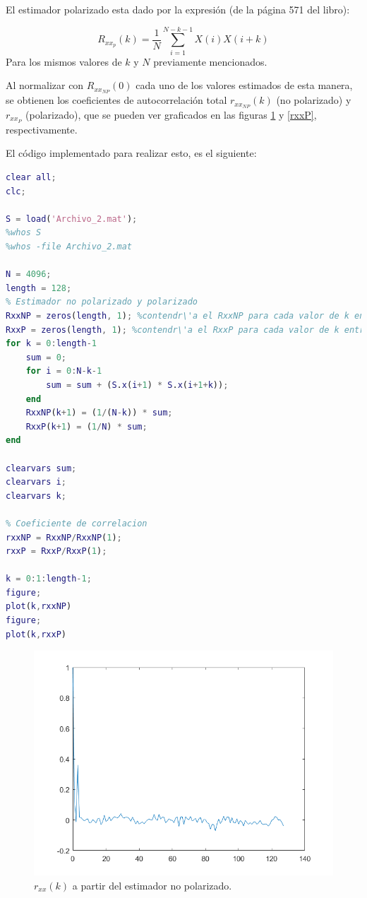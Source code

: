 El estimador polarizado esta dado por la expresión (de la página 571 del libro):

$$R_{xx_{p}}(k) = \frac{1}{N} \sum_{i=1}^{N-k-1}X(i)X(i+k)$$
Para los mismos valores de $k$ y $N$ previamente mencionados.

Al normalizar con $R_{xx_{NP}}(0)$ cada uno de los valores estimados de esta manera,  se obtienen los coeficientes de autocorrelación total $r_{xx_{NP}}(k)$ (no polarizado) y $r_{xx_{P}}$ (polarizado), que se pueden ver graficados en las figuras \ref{rxxNP} y \ref{rxxP}, respectivamente.

El c\'odigo implementado para realizar esto, es el siguiente:

\begin{lstlisting}[language=Matlab, caption=EJ1.m]
%% ITEM 1
clear all;
clc;

S = load('Archivo_2.mat');
%whos S
%whos -file Archivo_2.mat

N = 4096;
length = 128;
% Estimador no polarizado y polarizado
RxxNP = zeros(length, 1); %contendr\'a el RxxNP para cada valor de k entre 0 y 127
RxxP = zeros(length, 1); %contendr\'a el RxxP para cada valor de k entre 0 y 127
for k = 0:length-1
    sum = 0;
    for i = 0:N-k-1
        sum = sum + (S.x(i+1) * S.x(i+1+k));
    end
    RxxNP(k+1) = (1/(N-k)) * sum;
    RxxP(k+1) = (1/N) * sum; 
end

clearvars sum;
clearvars i;
clearvars k;

% Coeficiente de correlacion
rxxNP = RxxNP/RxxNP(1);
rxxP = RxxP/RxxP(1);

k = 0:1:length-1;
figure;
plot(k,rxxNP)
figure;
plot(k,rxxP)
\end{lstlisting}

\begin{figure}[H] %
\centering
\includegraphics[scale=0.45]{../EJ1/rxxNP}
\caption{$r_{xx}(k)$ a partir del estimador no polarizado.}
\label{rxxNP}
\end{figure}

